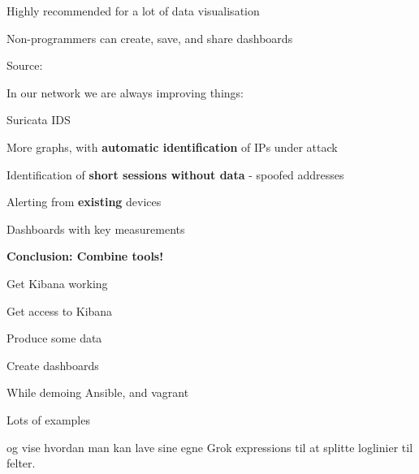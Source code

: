 \documentclass[20pt,landscape,a4paper,footrule]{foils}
\begin{document}
\centerline{Highly recommended for a lot of data visualisation}

Non-programmers can create, save, and share dashboards

Source:





In our network we are always improving things:
\begin{list1}
\item Suricata IDS 
\item More graphs, with {\bf automatic identification} of IPs under attack
\item Identification of {\bf short sessions without data} - spoofed addresses
\item Alerting from {\bf existing} devices
\item Dashboards with key measurements
\end{list1}

\vskip 2cm
\centerline{\bf\Large Conclusion: Combine tools!}




\begin{list2}
\item Get Kibana working
\item Get access to Kibana
\item Produce some data
\item Create dashboards
\end{list2}

While demoing Ansible, and vagrant

Lots of examples\\



og vise hvordan man kan lave sine egne Grok expressions til at splitte loglinier til felter.



\myquestionspage





\end{document}
